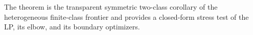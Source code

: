 The theorem is the transparent symmetric two-class corollary of the heterogeneous finite-class frontier and provides a closed-form stress test of the LP, its elbow, and its boundary optimizers.